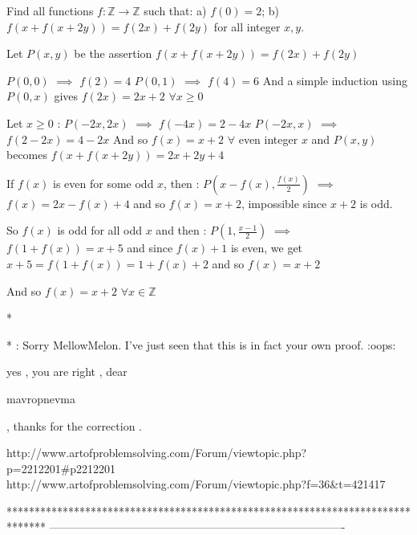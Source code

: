 \begin{solution}
	\begin{tcolorbox}Find all functions $f: \mathbb{Z}\to \mathbb{Z}$ such that:
a) $f(0)=2$;
b) $f(x+f(x+2y))=f(2x)+f(2y)$ for all integer $x,y$.\end{tcolorbox}
Let $P(x,y)$ be the assertion $f(x+f(x+2y))=f(2x)+f(2y)$

$P(0,0)$ $\implies$ $f(2)=4$
$P(0,1)$ $\implies$ $f(4)=6$
And a simple induction using $P(0,x)$ gives $f(2x)=2x+2$ $\forall x\ge 0$

Let $x\ge 0$ : 
$P(-2x,2x)$ $\implies$ $f(-4x)=2-4x$
$P(-2x,x)$ $\implies$ $f(2-2x)=4-2x$
And so $f(x)=x+2$ $\forall$ even integer $x$ and $P(x,y)$ becomes $f(x+f(x+2y))=2x+2y+4$

If $f(x)$ is even for some odd $x$, then :
$P(x-f(x),\frac{f(x)}2)$ $\implies$ $f(x)=2x-f(x)+4$ and so $f(x)=x+2$, impossible since $x+2$ is odd.

So $f(x)$ is odd for all odd $x$ and then :
$P(1,\frac{x-1}2)$ $\implies$ $f(1+f(x))=x+5$ and since $f(x)+1$ is even, we get $x+5=f(1+f(x))=1+f(x)+2$ and so $f(x)=x+2$

And so $\boxed{f(x)=x+2}$ $\forall x\in\mathbb Z$

** : Sorry MellowMelon. I've just seen that this is in fact your own proof. :oops:
\end{solution}



\begin{solution}
	yes , you are right  , dear \begin{bolded}mavropnevma\end{bolded} , thanks for the correction .
\end{solution}



\begin{solution}
	http://www.artofproblemsolving.com/Forum/viewtopic.php?p=2212201#p2212201
http://www.artofproblemsolving.com/Forum/viewtopic.php?f=36&t=421417
\end{solution}
*******************************************************************************
-------------------------------------------------------------------------------

